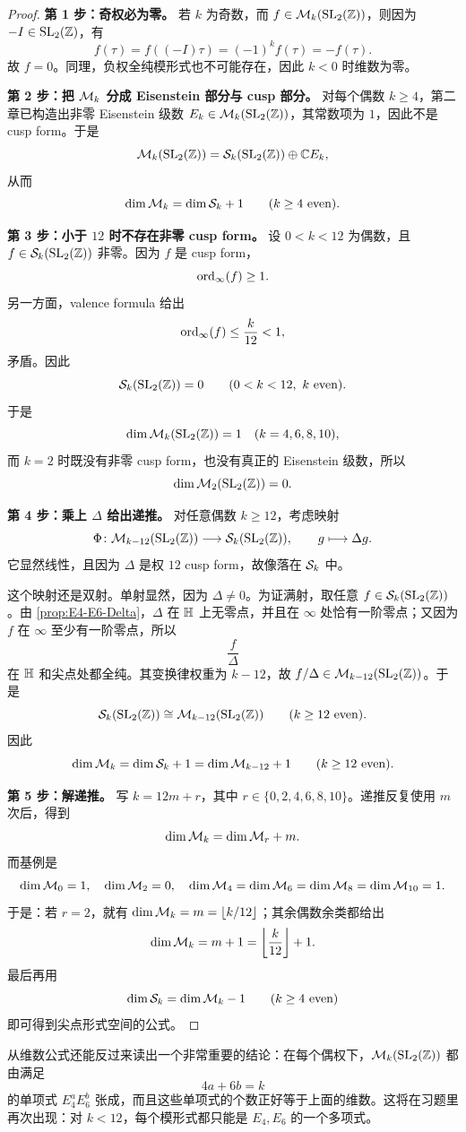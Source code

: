 \begin{proof}
\textbf{第 1 步：奇权必为零。}
若 $k$ 为奇数，而 $f\in \mathcal{M}_k(\mathrm{SL}_2(\mathbb{Z}))$，则因为 $-I\in\mathrm{SL}_2(\mathbb{Z})$，有
\[
  f(\tau)=f((-I)\tau)=(-1)^k f(\tau)=-f(\tau).
\]
故 $f=0$。同理，负权全纯模形式也不可能存在，因此 $k<0$ 时维数为零。

\textbf{第 2 步：把 $\mathcal{M}_k$ 分成 Eisenstein 部分与 cusp 部分。}
对每个偶数 $k\ge 4$，第二章已构造出非零 Eisenstein 级数 $E_k\in \mathcal{M}_k(\mathrm{SL}_2(\mathbb{Z}))$，其常数项为 $1$，因此不是 cusp form。于是
\[
  \mathcal{M}_k(\mathrm{SL}_2(\mathbb{Z}))=\mathcal{S}_k(\mathrm{SL}_2(\mathbb{Z}))\oplus \mathbb{C} E_k,
\]
从而
\[
  \dim \mathcal{M}_k=\dim \mathcal{S}_k+1 \qquad (k\ge 4\text{ even}).
\]

\textbf{第 3 步：小于 $12$ 时不存在非零 cusp form。}
设 $0<k<12$ 为偶数，且 $f\in \mathcal{S}_k(\mathrm{SL}_2(\mathbb{Z}))$ 非零。因为 $f$ 是 cusp form，
\[
  \mathrm{ord}_\infty(f)\ge 1.
\]
另一方面，valence formula 给出
\[
  \mathrm{ord}_\infty(f)\le \frac{k}{12}<1,
\]
矛盾。因此
\[
  \mathcal{S}_k(\mathrm{SL}_2(\mathbb{Z}))=0 \qquad (0<k<12,\ k\text{ even}).
\]
于是
\[
  \dim \mathcal{M}_k(\mathrm{SL}_2(\mathbb{Z}))=1 \quad (k=4,6,8,10),
\]
而 $k=2$ 时既没有非零 cusp form，也没有真正的 Eisenstein 级数，所以
\[
  \dim \mathcal{M}_2(\mathrm{SL}_2(\mathbb{Z}))=0.
\]

\textbf{第 4 步：乘上 $\Delta$ 给出递推。}
对任意偶数 $k\ge 12$，考虑映射
\[
  \Phi\colon \mathcal{M}_{k-12}(\mathrm{SL}_2(\mathbb{Z}))\longrightarrow \mathcal{S}_k(\mathrm{SL}_2(\mathbb{Z})),
  \qquad g\longmapsto \Delta g.
\]
它显然线性，且因为 $\Delta$ 是权 $12$ cusp form，故像落在 $\mathcal{S}_k$ 中。

这个映射还是双射。单射显然，因为 $\Delta\neq 0$。为证满射，取任意 $f\in \mathcal{S}_k(\mathrm{SL}_2(\mathbb{Z}))$。由 \cref{prop:E4-E6-Delta}，$\Delta$ 在 $\mathbb{H}$ 上无零点，并且在 $\infty$ 处恰有一阶零点；又因为 $f$ 在 $\infty$ 至少有一阶零点，所以
\[
  \frac{f}{\Delta}
\]
在 $\mathbb{H}$ 和尖点处都全纯。其变换律权重为 $k-12$，故 $f/\Delta\in \mathcal{M}_{k-12}(\mathrm{SL}_2(\mathbb{Z}))$。于是
\[
  \mathcal{S}_k(\mathrm{SL}_2(\mathbb{Z}))\cong \mathcal{M}_{k-12}(\mathrm{SL}_2(\mathbb{Z}))
  \qquad (k\ge 12\text{ even}).
\]
因此
\[
  \dim \mathcal{M}_k=\dim \mathcal{S}_k+1=\dim \mathcal{M}_{k-12}+1
  \qquad (k\ge 12\text{ even}).
\]

\textbf{第 5 步：解递推。}
写 $k=12m+r$，其中 $r\in\{0,2,4,6,8,10\}$。递推反复使用 $m$ 次后，得到
\[
  \dim \mathcal{M}_k=\dim \mathcal{M}_r+m.
\]
而基例是
\[
  \dim \mathcal{M}_0=1,\quad \dim \mathcal{M}_2=0,\quad
  \dim \mathcal{M}_4=\dim \mathcal{M}_6=\dim \mathcal{M}_8=\dim \mathcal{M}_{10}=1.
\]
于是：若 $r=2$，就有 $\dim \mathcal{M}_k=m=\lfloor k/12\rfloor$；其余偶数余类都给出
\[
  \dim \mathcal{M}_k=m+1=\left\lfloor\frac{k}{12}\right\rfloor+1.
\]
最后再用
\[
  \dim \mathcal{S}_k=\dim \mathcal{M}_k-1 \qquad (k\ge 4\text{ even})
\]
即可得到尖点形式空间的公式。
\end{proof}

\begin{remark}[与 $E_4,E_6$ 的关系]
从维数公式还能反过来读出一个非常重要的结论：在每个偶权下，$\mathcal{M}_k(\mathrm{SL}_2(\mathbb{Z}))$ 都由满足
\[
  4a+6b=k
\]
的单项式 $E_4^aE_6^b$ 张成，而且这些单项式的个数正好等于上面的维数。这将在习题里再次出现：对 $k<12$，每个模形式都只能是 $E_4,E_6$ 的一个多项式。
\end{remark}
